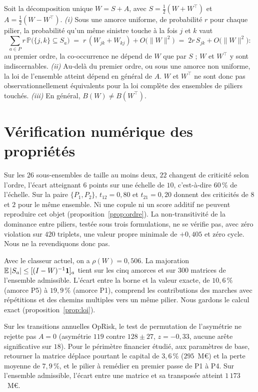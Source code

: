 \begin{proposition}
\label{prop:nonid}
Soit la décomposition unique $W=S+A$, avec $S=\tfrac12(W+W^\top)$ et $A=\tfrac12(W-W^\top)$.
\emph{(i)} Sous une amorce uniforme, de probabilité $r$ pour chaque pilier, la probabilité qu'un
même sinistre touche à la fois $j$ et $k$ vaut
\[
  \sum_{a\in P} r\,\mathbb P\bigl(\{j,k\}\subseteq S_a\bigr)
  \;=\; r\,(W_{jk}+W_{kj})+O\bigl(\lVert W\rVert^2\bigr)
  \;=\; 2r\,S_{jk}+O\bigl(\lVert W\rVert^2\bigr) :
\]
au premier ordre, la co-occurrence ne dépend de $W$ que par $S$ ; $W$ et $W^\top$ y sont
indiscernables. \emph{(ii)} Au-delà du premier ordre, ou sous une amorce non uniforme, la loi de
l'ensemble atteint dépend en général de $A$. $W$ et $W^\top$ ne sont donc pas observationnellement
équivalents pour la loi complète des ensembles de piliers touchés. \emph{(iii)} En général,
$B(W)\neq B(W^\top)$.
\end{proposition}


\section{Vérification numérique des propriétés}
\label{sec:verif-proprietes}

Sur les $26$ sous-ensembles de taille au moins deux, $22$ changent de criticité selon l'ordre,
l'écart atteignant $6$ points sur une échelle de $10$, c'est-à-dire $60\,\%$ de l'échelle. Sur la
paire $\{P_1,P_2\}$, $t_{12}=0{,}80$ et $t_{21}=0{,}20$ donnent des
criticités de $8$ et $2$ pour le même ensemble. Ni une copule ni un score additif ne peuvent
reproduire cet objet (proposition~\ref{prop:ordre}). La
non-transitivité de la dominance entre piliers, testée sous trois formulations, ne se vérifie pas,
avec zéro violation sur $420$ triplets, une valeur propre minimale de $+0{,}405$ et zéro cycle.
Nous ne la revendiquons donc pas.

Avec le classeur actuel, on a $\rho(W)=0{,}506$. La majoration $\mathbb{E}\,|S_a|\le[(I-W)^{-1}\mathbf 1]_a$
tient sur les cinq amorces et sur $300$ matrices de l'ensemble admissible. L'écart entre la borne
et la valeur exacte, de $10{,}6\,\%$ (amorce P5) à $19{,}9\,\%$ (amorce P1), comprend les
contributions des marches avec répétitions et des chemins multiples vers un même pilier. Nous gardons le calcul exact (proposition~\ref{prop:loi}).

Sur les transitions annuelles OpRisk, le test de permutation de l'asymétrie ne rejette pas $A=0$
(asymétrie $119$ contre $128 \pm 27$, $z=-0{,}33$, aucune arête significative sur $18$). Pour le
périmètre financier étudié, aux paramètres de base, retourner la matrice déplace pourtant le capital de $3{,}6\,\%$
($295$~M\euro) et la perte moyenne de $7{,}9\,\%$, et le pilier à remédier en premier passe de P1 à
P4. Sur l'ensemble admissible, l'écart entre une matrice et sa transposée atteint $1\,173$~M\euro{}.

